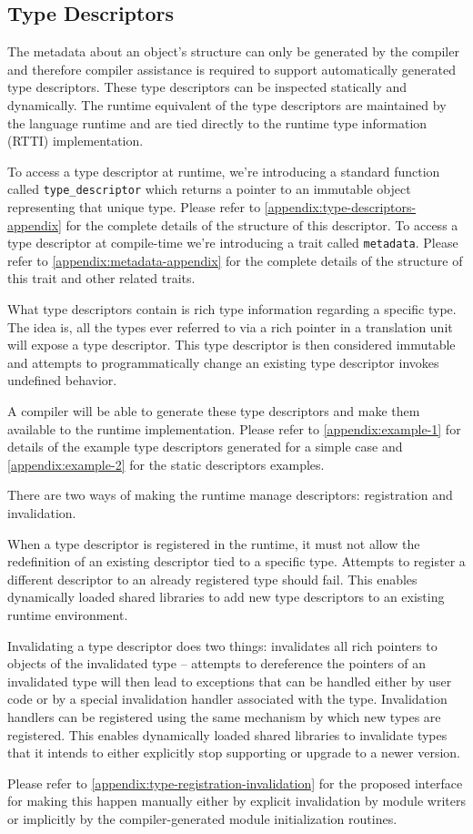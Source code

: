 \subsection{Type Descriptors}

The metadata about an object's structure can only be generated by the compiler
and therefore compiler assistance is required to support automatically generated
type descriptors. These type descriptors can be inspected statically and
dynamically. The runtime equivalent of the type descriptors are maintained by
the language runtime and are tied directly to the runtime type information
(RTTI) implementation.

To access a type descriptor at runtime, we’re introducing a standard function
called \verb+type_descriptor+ which returns a pointer to an immutable object
representing that unique type. Please refer to
\autoref{appendix:type-descriptors-appendix} for the complete details of the
structure of this descriptor. To access a type descriptor at compile-time we're
introducing a trait called \verb+metadata+. Please refer to
\autoref{appendix:metadata-appendix} for the complete details of the structure
of this trait and other related traits.

What type descriptors contain is rich type information regarding a specific
type. The idea is, all the types ever referred to via a rich pointer in a
translation unit will expose a type descriptor. This type descriptor is then
considered immutable and attempts to programmatically change an existing type
descriptor invokes undefined behavior.

A compiler will be able to generate these type descriptors and make them
available to the runtime implementation. Please refer to
\autoref{appendix:example-1} for details of the example type descriptors
generated for a simple case and \autoref{appendix:example-2} for the static
descriptors examples.

There are two ways of making the runtime manage descriptors: registration and
invalidation.

When a type descriptor is registered in the runtime, it must not allow the
redefinition of an existing descriptor tied to a specific type. Attempts to
register a different descriptor to an already registered type should fail. This
enables dynamically loaded shared libraries to add new type descriptors to an
existing runtime environment.

Invalidating a type descriptor does two things: invalidates all rich pointers to
objects of the invalidated type -- attempts to dereference the pointers of an
invalidated type will then lead to exceptions that can be handled either by user
code or by a special invalidation handler associated with the type. Invalidation
handlers can be registered using the same mechanism by which new types are
registered. This enables dynamically loaded shared libraries to invalidate types
that it intends to either explicitly stop supporting or upgrade to a newer
version.

Please refer to \autoref{appendix:type-registration-invalidation} for the
proposed interface for making this happen manually either by explicit
invalidation by module writers or implicitly by the compiler-generated module
initialization routines.
